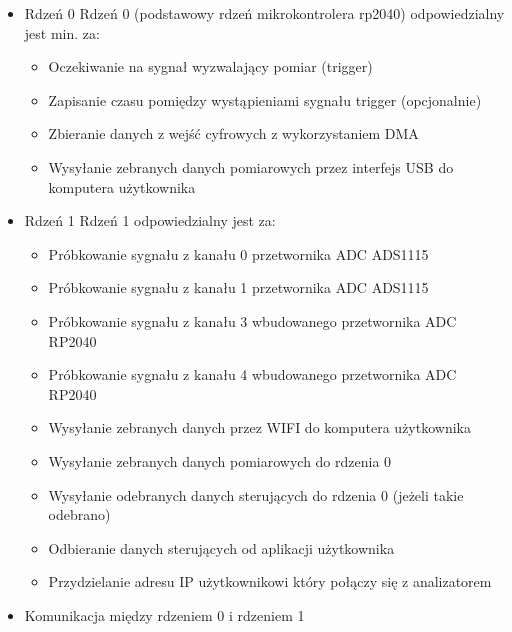 \begin{itemize}
    \item Rdzeń 0
    Rdzeń 0 (podstawowy rdzeń mikrokontrolera rp2040) odpowiedzialny jest min. za:
    \begin{itemize}
        \item Oczekiwanie na sygnał wyzwalający pomiar (trigger)
        \item Zapisanie czasu pomiędzy wystąpieniami sygnału trigger (opcjonalnie) 
        \item Zbieranie danych z wejść cyfrowych z wykorzystaniem DMA
        \item Wysyłanie zebranych danych pomiarowych przez interfejs USB do komputera użytkownika
    \end{itemize}

    \item Rdzeń 1
    Rdzeń 1 odpowiedzialny jest za:
    \begin{itemize}
        \item Próbkowanie sygnału z kanału 0 przetwornika ADC ADS1115
        \item Próbkowanie sygnału z kanału 1 przetwornika ADC ADS1115
        \item Próbkowanie sygnału z kanału 3 wbudowanego przetwornika ADC RP2040
        \item Próbkowanie sygnału z kanału 4 wbudowanego przetwornika ADC RP2040
        \item Wysyłanie zebranych danych przez WIFI do komputera użytkownika
        \item Wysyłanie zebranych danych pomiarowych do rdzenia 0
        \item Wysyłanie odebranych danych sterujących do rdzenia 0 (jeżeli takie odebrano)
        \item Odbieranie danych sterujących od aplikacji użytkownika
        \item Przydzielanie adresu IP użytkownikowi który połączy się z analizatorem 
    \end{itemize}

    \item Komunikacja między rdzeniem 0 i rdzeniem 1
    \begin{figure}[h!]
    \centering
    \begin{tikzpicture}[
        corebox/.style={
            rectangle,
            draw=blue!55,
            line width=1mm,
            fill=blue!20,
            rounded corners,
            minimum width=7cm,
            minimum height=10cm,
            align=left,
            text width=6cm,
            font=\bfseries
        },
        arrow/.style={
            <->,
            ultra thick,
            draw=blue!70
        }
    ]


\end{tikzpicture}
\end{figure}
\end{itemize}
